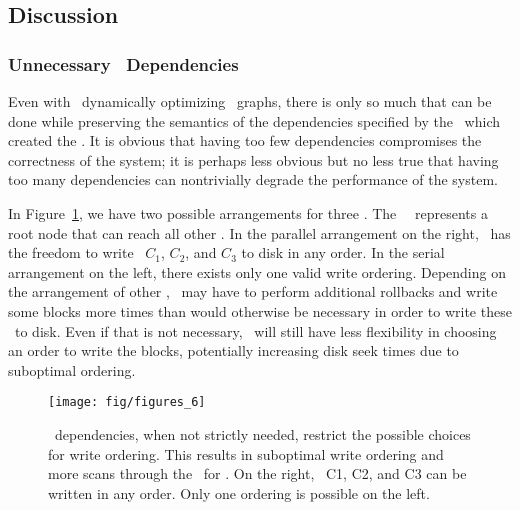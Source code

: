 


\subsection{Discussion}
\label{sec:chdescs:discussion}

\subsubsection{Unnecessary \ChDesc\ Dependencies}
Even with \Kudos\ dynamically optimizing \chdesc\ graphs, there is only so much
that can be done while preserving the semantics of the dependencies specified by
the \module\ which created the \chdescs. It is obvious that having too few
dependencies compromises the correctness of the system; it is perhaps less
obvious but no less true that having too many dependencies can nontrivially
degrade the performance of the system.

In Figure~\ref{fig:chdescarrange}, we have two possible arrangements for three
\chdescs. The \noop\ \chdesc\ represents a root node that can reach all
other \chdescs. In the parallel arrangement on the right, \Kudos\ has the
freedom to write \chdescs\ $C_1$, $C_2$, and $C_3$ to disk in any order. In the
serial arrangement on the left, there exists only one valid write ordering.
Depending on the arrangement of other \chdescs, \Kudos\ may have to perform
additional rollbacks and write some blocks more times than would otherwise be
necessary in order to write these \chdescs\ to disk. Even if that is not
necessary, \Kudos\ will still have less flexibility in choosing an order to
write the blocks, potentially increasing disk seek times due to suboptimal
ordering.

\begin{figure}[htb]
  \centering
  \texttt{[image: fig/figures\_6]}
  \caption{\label{fig:chdescarrange} \Chdesc\ dependencies, when
  not strictly needed, restrict the possible choices for write ordering.
  This results in suboptimal write ordering and more scans through the
  \chdescs\ for \Kudos. On the right, \chdescs\ C1, C2, and C3 can be written
  in any order. Only one ordering is possible on the left.}
\end{figure}


